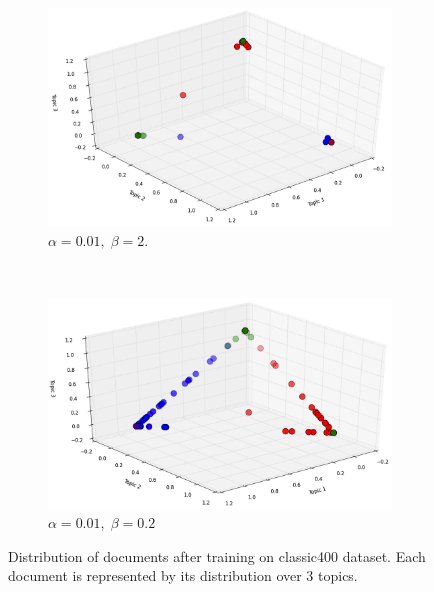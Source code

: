 \documentclass[twoside,12pt]{article}
\begin{document}
\begin{figure}
        \begin{subfigure}[b]{0.5\textwidth}
                \includegraphics[width=\textwidth]{figs/classicalpha001beta2.png}
                \caption{$\alpha=0.01,\;\beta=2.$}
                \label{fig:mouse}
        \end{subfigure}%
        ~ %
                  \begin{subfigure}[b]{0.5\textwidth}
                \includegraphics[width=\textwidth]{figs/classicalpha001beta02.png}
                \caption{$\alpha=0.01,\;\beta=0.2$}
                \label{fig:mouse}
        \end{subfigure}
        \caption{Distribution of documents after training on classic400 dataset. Each document is represented by its distribution over 3 topics.}
        \label{figClassicDist}
\end{figure}
\end{document}
